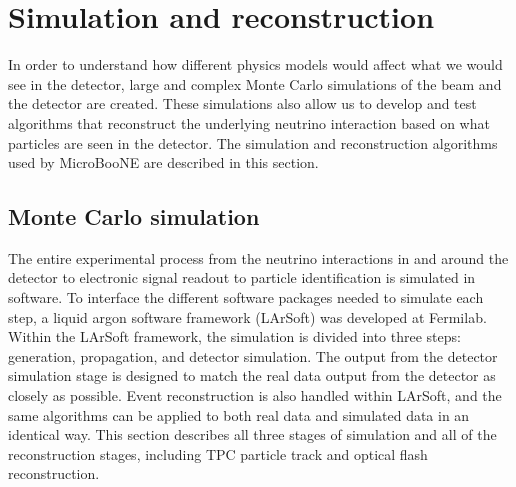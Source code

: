 \section{Simulation and reconstruction}\label{sec:simreco}
In order to understand how different physics models would affect what we would
see in the detector, large and complex Monte Carlo simulations of the beam and
the detector are created.  These simulations also allow us to develop and test
algorithms that reconstruct the underlying neutrino interaction based on what
particles are seen in the detector. The simulation and reconstruction
algorithms used by MicroBooNE are described in this section.


\subsection{Monte Carlo simulation}\label{sec:simulation}
  The entire experimental process from the neutrino interactions in and around
  the detector to electronic signal readout to particle identification is
  simulated in software. To interface the different software packages needed to
  simulate each step, a liquid argon software framework (LArSoft) was developed
  at Fermilab. Within the LArSoft framework, the simulation is divided into
  three steps: generation, propagation, and detector simulation.  The output
  from the detector simulation stage is designed to match the real data output
  from the detector as closely as possible. Event reconstruction is also
  handled within LArSoft, and the same algorithms can be applied to both real
  data and simulated data in an identical way. This section describes all three
  stages of simulation and all of the reconstruction stages, including TPC
  particle track and optical flash reconstruction.

